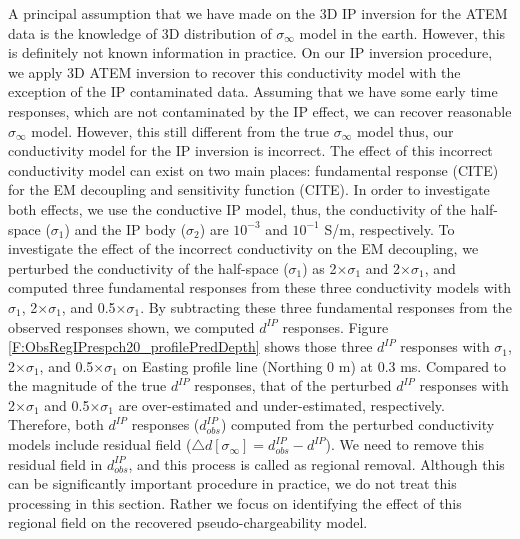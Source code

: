 \documentclass[a4paper, 11pt]{article}
\newcommand{\siginf}{\sigma_\infty}
\newcommand{\dip}{d^{IP}}
\begin{document}
A principal assumption that we have made on the 3D IP inversion for the ATEM data is the knowledge of 3D distribution of $\siginf$ model in the earth. However, this is definitely not known information in practice. On our IP inversion procedure, we apply 3D ATEM inversion to recover this conductivity model with the exception of the IP contaminated data. Assuming that we have some early time responses, which are not contaminated by the IP effect, we can recover reasonable $\siginf$ model. However, this still different from the true $\siginf$ model thus, our conductivity model for the IP inversion is incorrect. The effect of this incorrect conductivity model can exist on two main places: fundamental response (CITE) for the EM decoupling and sensitivity function (CITE). In order to investigate both effects, we use the conductive IP model, thus, the conductivity of the half-space ($\sigma_1$) and the IP body ($\sigma_2$) are $10^{-3}$ and $10^{-1}$ S/m, respectively. To investigate the effect of the incorrect conductivity on the EM decoupling, we perturbed the conductivity of the half-space ($\sigma_1$) as 2$\times \sigma_1$ and 2$\times \sigma_1$, and computed three fundamental responses from these three conductivity models with $\sigma_1$, 2$\times \sigma_1$, and 0.5$\times \sigma_1$. By subtracting these three fundamental responses from the observed responses shown, we computed $\dip$ responses. Figure \ref{F:ObsRegIPrespch20_profilePredDepth} shows those three $\dip$ responses with $\sigma_1$, 2$\times \sigma_1$, and 0.5$\times \sigma_1$ on Easting profile line (Northing 0 m) at 0.3 ms. Compared to the magnitude of the true $\dip$ responses, that of the perturbed $\dip$ responses with  2$\times \sigma_1$ and 0.5$\times \sigma_1$ are over-estimated and under-estimated, respectively. Therefore, both $\dip$ responses ($\dip_{obs}$) computed from the perturbed conductivity models include residual field ($\triangle d[\siginf] = \dip_{obs}-\dip$). We need to remove this residual field in $\dip_{obs}$, and this process is called as regional removal. Although this can be significantly important procedure in practice, we do not treat this processing in this section. Rather we focus on identifying the effect of this regional field on the recovered pseudo-chargeability model. 
\end{document}
